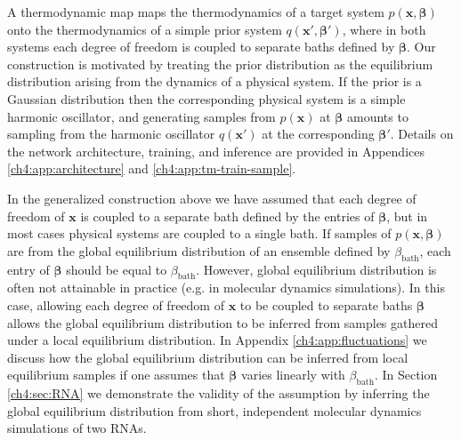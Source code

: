
A thermodynamic map maps the thermodynamics of a target system $p(\mathbf{x},\bm{\beta})$ onto the thermodynamics of a simple prior system $q(\mathbf{x}',\bm{\beta}')$, where in both systems each degree of freedom is coupled to separate baths defined by $\bm{\beta}$. Our construction is motivated by treating the prior distribution as the equilibrium distribution arising from the dynamics of a physical system. If the prior is a Gaussian distribution then the corresponding physical system is a simple harmonic oscillator, and generating samples from $p(\mathbf{x})$ at $\bm{\beta}$ amounts to sampling from the harmonic oscillator $q(\mathbf{x}')$ at the corresponding $\bm{\beta}'$. Details on the network architecture, training, and inference are provided in Appendices \ref{ch4:app:architecture} and \ref{ch4:app:tm-train-sample}.

In the generalized construction above we have assumed that each degree of freedom of $\mathbf{x}$ is coupled to a separate bath defined by the entries of $\bm{\beta}$, but in most cases physical systems are coupled to a single bath. If samples of $p(\mathbf{x},\bm{\beta})$ are from the global equilibrium distribution of an ensemble defined by $\beta_\mathrm{bath}$, each entry of $\bm{\beta}$ should be equal to $\beta_\mathrm{bath}$. However, global equilibrium distribution is often not attainable in practice (e.g. in molecular dynamics simulations). In this case, allowing each degree of freedom of $\mathbf{x}$ to be coupled to separate baths $\bm{\beta}$ allows the global equilibrium distribution to be inferred from samples gathered under a local equilibrium distribution. In Appendix \ref{ch4:app:fluctuations} we discuss how the global equilibrium distribution can be inferred from local equilibrium samples if one assumes that $\bm{\beta}$ varies linearly with $\beta_{\mathrm{bath}}$. In Section \ref{ch4:sec:RNA} we demonstrate the validity of the assumption by inferring the global equilibrium distribution from short, independent molecular dynamics simulations of two RNAs.

